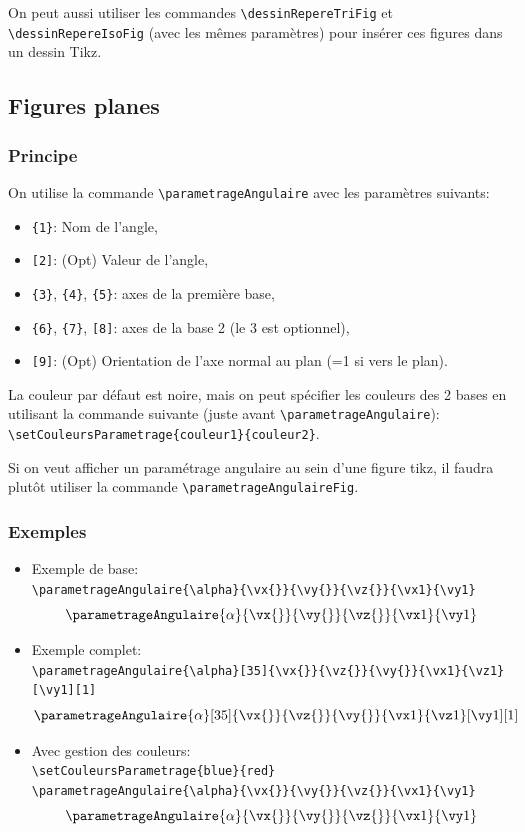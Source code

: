 \documentclass[11pt]{ltxdockit}[2010/09/26]
\begin{document}
\vspace{1em}
On peut aussi utiliser les commandes \verb!\dessinRepereTriFig! et \verb!\dessinRepereIsoFig! (avec les mêmes paramètres) pour insérer ces figures dans un dessin Tikz.

\subsection{Figures planes}
\subsubsection{Principe}
\noindent On utilise la commande \verb!\parametrageAngulaire! avec les paramètres suivants: 
\begin{itemize}
\item \verb!{1}!: Nom de l'angle,
\item \verb![2]!: (Opt) Valeur de l'angle,
\item \verb!{3}!, \verb!{4}!, \verb!{5}!: axes de la première base,
\item \verb!{6}!, \verb!{7}!, \verb![8]!: axes de la base 2 (le 3\ieme{} est optionnel),
\item \verb![9]!: (Opt) Orientation de l'axe normal au plan (=1 si vers le plan).
\end{itemize}

\vspace{1em}
\noindent La couleur par défaut est noire, mais on peut spécifier les couleurs des 2 bases en utilisant la commande suivante (juste avant \verb!\parametrageAngulaire!): \verb!\setCouleursParametrage{couleur1}{couleur2}!.

\noindent Si on veut afficher un paramétrage angulaire au sein d'une figure tikz, il faudra plutôt utiliser la commande \verb!\parametrageAngulaireFig!.

\subsubsection{Exemples}
\begin{itemize}
\item Exemple de base: \\ \verb!\parametrageAngulaire{\alpha}{\vx{}}{\vy{}}{\vz{}}{\vx1}{\vy1}!
\[ \parametrageAngulaire{\alpha}{\vx{}}{\vy{}}{\vz{}}{\vx1}{\vy1} \]
\item Exemple complet: \\ \verb!\parametrageAngulaire{\alpha}[35]{\vx{}}{\vz{}}{\vy{}}{\vx1}{\vz1}[\vy1][1]!
\[ \parametrageAngulaire{\alpha}[35]{\vx{}}{\vz{}}{\vy{}}{\vx1}{\vz1}[\vy1][1] \]
\item Avec gestion des couleurs: \\ \verb!\setCouleursParametrage{blue}{red}!\\ \verb!\parametrageAngulaire{\alpha}{\vx{}}{\vy{}}{\vz{}}{\vx1}{\vy1}!
\[\setCouleursParametrage{blue}{red}\parametrageAngulaire{\alpha}{\vx{}}{\vy{}}{\vz{}}{\vx1}{\vy1}\]
\end{itemize}
\end{document}

